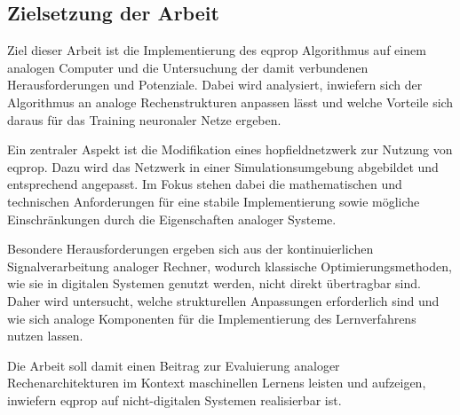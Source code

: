 \subsection{Zielsetzung der Arbeit}

Ziel dieser Arbeit ist die Implementierung des \gls{eqprop} Algorithmus auf einem analogen Computer und die Untersuchung der damit verbundenen Herausforderungen und Potenziale. Dabei wird analysiert, inwiefern sich der Algorithmus an analoge Rechenstrukturen anpassen lässt und welche Vorteile sich daraus für das Training neuronaler Netze ergeben.

Ein zentraler Aspekt ist die Modifikation eines \gls{hopfieldnetzwerk} zur Nutzung von \gls{eqprop}. Dazu wird das Netzwerk in einer Simulationsumgebung abgebildet und entsprechend angepasst. Im Fokus stehen dabei die mathematischen und technischen Anforderungen für eine stabile Implementierung sowie mögliche Einschränkungen durch die Eigenschaften analoger Systeme.

Besondere Herausforderungen ergeben sich aus der kontinuierlichen Signalverarbeitung analoger Rechner, wodurch klassische Optimierungsmethoden, wie sie in digitalen Systemen genutzt werden, nicht direkt übertragbar sind. Daher wird untersucht, welche strukturellen Anpassungen erforderlich sind und wie sich analoge Komponenten für die Implementierung des Lernverfahrens nutzen lassen.

Die Arbeit soll damit einen Beitrag zur Evaluierung analoger Rechenarchitekturen im Kontext maschinellen Lernens leisten und aufzeigen, inwiefern \gls{eqprop} auf nicht-digitalen Systemen realisierbar ist.

